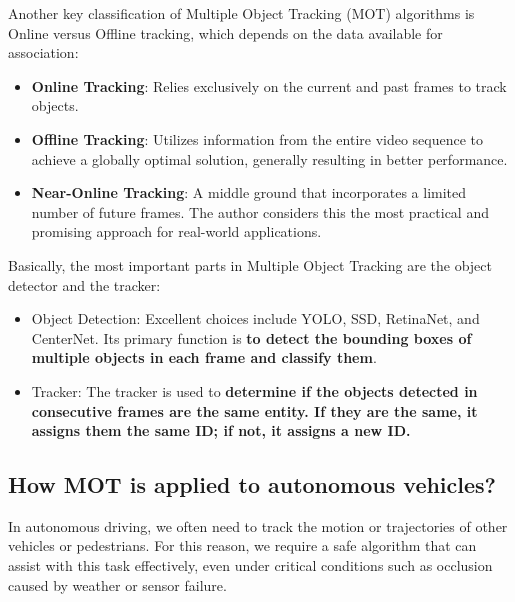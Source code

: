 \documentclass[10pt,twocolumn,letterpaper]{article}
\begin{document}
Another key classification of Multiple Object Tracking (MOT) algorithms is Online versus Offline tracking, which depends on the data available for association:
\begin{itemize}
    \item \textbf{Online Tracking}: Relies exclusively on the current and past frames to track objects.
    \item \textbf{Offline Tracking}: Utilizes information from the entire video sequence to achieve a globally optimal solution, generally resulting in better performance.
    \item \textbf{Near-Online Tracking}: A middle ground that incorporates a limited number of future frames. The author considers this the most practical and promising approach for real-world applications.
\end{itemize}

Basically, the most important parts in Multiple Object Tracking are the object detector and the tracker:
\begin{itemize}
    \item Object Detection: Excellent choices include YOLO, SSD, RetinaNet, and CenterNet. Its primary function is \textbf{to detect the bounding boxes of multiple objects in each frame and classify them}.
    \item Tracker: The tracker is used to \textbf{determine if the objects detected in consecutive frames are the same entity. If they are the same, it assigns them the same ID; if not, it assigns a new ID.}
\end{itemize}
\subsection{How MOT is applied to autonomous vehicles?}
In autonomous driving, we often need to track the motion or trajectories of other vehicles or pedestrians. For this reason, we require a safe algorithm that can assist with this task effectively, even under critical conditions such as occlusion caused by weather or sensor failure.
\end{document}
